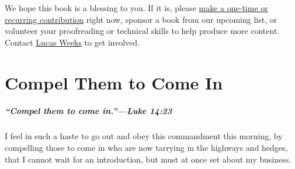 \documentclass[
]{book}
\begin{document}
We hope this book is a blessing to you. If it is, please \href{https://warhornmedia.com/give}{make a one-time or recurring contribution} right now, sponsor a book from our upcoming list, or volunteer your proofreading or technical skills to help produce more content. Contact \href{mailto:lucas@beggarsborn.com}{Lucas Weeks} to get involved.

\clearpage
\setcounter{page}{1}

\hypertarget{compel-them-to-come-in}{%
\chapter{Compel Them to Come In}\label{compel-them-to-come-in}}

\hypertarget{compel-them-to-come-in.luke-1423}{%
\paragraph{``Compel them to come in.''---Luke 14:23}\label{compel-them-to-come-in.luke-1423}}

I feel in such a haste to go out and obey this commandment this morning, by compelling those to come in who are now tarrying in the highways and hedges, that I cannot wait for an introduction, but must at once set about my business.
\end{document}
